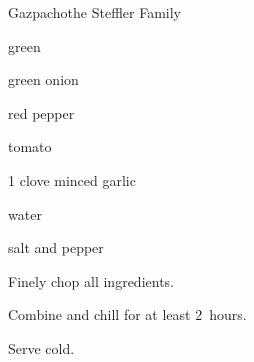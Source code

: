 \begin{recipe}{Gazpacho}{the Steffler Family}{}

\begin{ingredients}
\item {} 
\item {} green 
\item {} 
\item \C{\quarter} green onion
\item \C{} red pepper
\item {} 
\item {} tomato
\item 1 clove minced garlic
\item {} water
\item salt and pepper
\end{ingredients}

\begin{directions}
\item Finely chop all ingredients.
\item Combine and chill for at least 2~hours.
\item Serve cold.
\end{directions}
\end{recipe}
